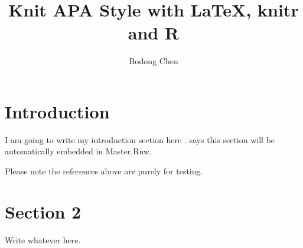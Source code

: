 \documentclass[doc]{apa6}\usepackage{knitr}
\title{Knit APA Style with LaTeX, knitr and R}
\author{Bodong Chen}
\affiliation{University of Toronto}
\begin{document}
\maketitle





\section{Introduction}

I am going to write my introduction section here \parencite{Tufte2006}. \textcite{Tufte1990} says this section will be automatically embedded in Master.Rnw.

Please note the references above are purely for testing.


\section{Section 2}

Write whatever here.


\printbibliography
\end{document}
